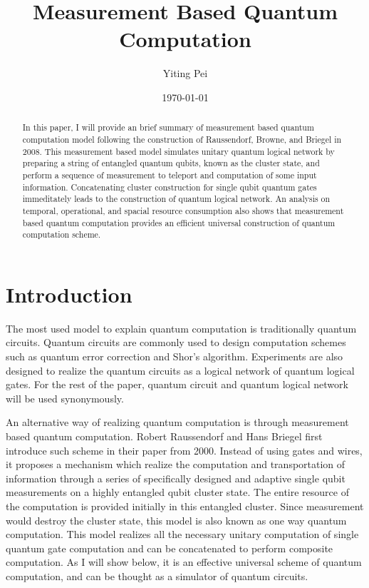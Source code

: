 \documentclass[twocolumn,secnumarabic,amssymb, nobibnotes, aps, prd]{revtex4-2}
\begin{document}
\title{Measurement Based Quantum Computation}

\author{Yiting Pei}%
\date{\today}%

\begin{abstract}
    In this paper, I will provide an brief summary of measurement based quantum computation model following the construction of Raussendorf, Browne, and Briegel in 2008. This measurement based model simulates unitary quantum logical network by preparing a string of entangled quantum qubits, known as the cluster state, and perform a sequence of measurement to teleport and computation of some input information. Concatenating cluster construction for single qubit quantum gates immeditately leads to the construction of quantum logical network. An analysis on temporal, operational, and spacial resource consumption also shows that measurement based quantum computation provides an efficient universal construction of quantum computation scheme.
\end{abstract}
\maketitle

\section{Introduction}
The most used model to explain quantum computation is traditionally quantum circuits. Quantum circuits are commonly used to design computation schemes such as quantum error correction and Shor's algorithm. Experiments are also designed to realize the quantum circuits as a logical network of quantum logical gates. For the rest of the paper, quantum circuit and quantum logical network will be used synonymously.\par

An alternative way of realizing quantum computation is through measurement based quantum computation. Robert Raussendorf and Hans Briegel first introduce such scheme in their paper from 2000. Instead of using gates and wires, it proposes a mechanism which realize the computation and transportation of information through a series of specifically designed and adaptive single qubit measurements on a highly entangled qubit cluster state. The entire resource of the computation is provided initially in this entangled cluster. Since measurement would destroy the cluster state, this model is also known as one way quantum computation. This model realizes all the necessary unitary computation of single quantum gate computation and can be concatenated to perform composite computation. As I will show below, it is an effective universal scheme of quantum computation, and can be thought as a simulator of quantum circuits.
\end{document}
